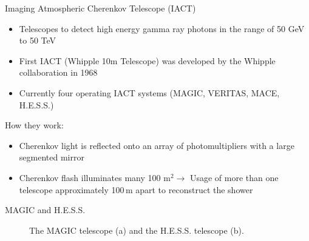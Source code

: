 \documentclass[aspectratio=1610, 10pt]{beamer}
\begin{document}
\begin{frame}{Imaging Atmospheric Cherenkov Telescope (IACT)}
  \begin{itemize}
    \item Telescopes to detect high energy gamma ray photons in the range of 50 GeV to 50 TeV
    \medskip
    \item First IACT (Whipple 10m Telescope) was developed by the Whipple collaboration in 1968
    \medskip
    \item Currently four operating IACT systems (MAGIC, VERITAS, MACE, H.E.S.S.)
  \end{itemize}
\vspace{0.5cm}
How they work:
\begin{itemize}
  \item Cherenkov light is reflected onto an array of photomultipliers with a large segmented mirror
  \medskip
  \item Cherenkov flash illuminates many 100 $\mathrm{m}^2 \rightarrow$ Usage of more than one telescope approximately 100$\, \mathrm{m}$ apart to
  reconstruct the shower
\end{itemize}
\end{frame}

\begin{frame}{MAGIC and H.E.S.S.}
  \begin{figure}
      \hspace{0.5cm}
  \caption{ The MAGIC telescope (a) and the H.E.S.S. telescope (b).}
  \end{figure}
\end{frame}
\end{document}
